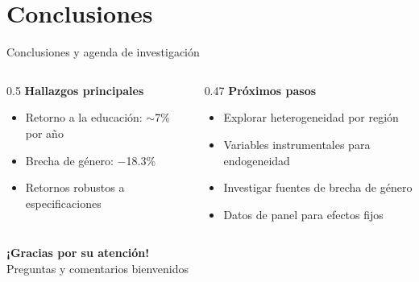 \documentclass[aspectratio=169]{beamer}
\begin{document}
\section{Conclusiones}

\begin{frame}{Conclusiones y agenda de investigación}
  \begin{columns}[T]
    \begin{column}{0.5\textwidth}
      \textbf{Hallazgos principales}
      \begin{itemize}
        \item Retorno a la educación: $\sim$7\% por año
        \item Brecha de género: $-$18.3\%
        \item Retornos robustos a especificaciones
      \end{itemize}
    \end{column}
    \begin{column}{0.47\textwidth}
      \textbf{Próximos pasos}
      \begin{itemize}
        \item Explorar heterogeneidad por región
        \item Variables instrumentales para endogeneidad
        \item Investigar fuentes de brecha de género
        \item Datos de panel para efectos fijos
      \end{itemize}
    \end{column}
  \end{columns}

  \vspace{1.5em}
  \begin{center}
    \large \textbf{¡Gracias por su atención!} \\[0.3em]
    \normalsize Preguntas y comentarios bienvenidos
  \end{center}
\end{frame}
\end{document}
